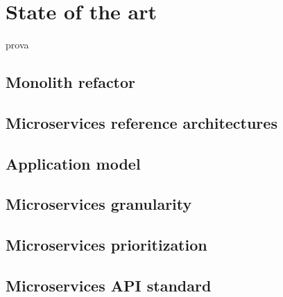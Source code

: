 \chapter{State of the art}
\label{chp:sota}
prova

\section{Monolith refactor}
\label{chp:sota:sec:monolit-refactor}

\section{Microservices reference architectures}
\label{chp:sota:sec:microservices-ra}

\section{Application model}
\label{chp:sota:sec:application-model}

\section{Microservices granularity}
\label{chp:sota:sec:microservices-granularity}

\section{Microservices prioritization}
\label{chp:sota:sec:microservices=prioritization}

\section{Microservices API standard}
\label{chp:sota:sec:microservices-api-standard}
